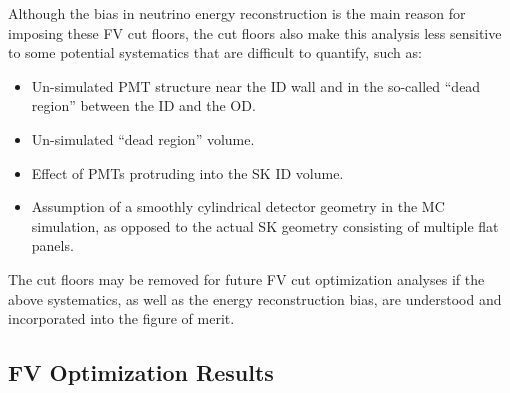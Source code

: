 Although the bias in neutrino energy reconstruction is the main reason for
imposing these FV cut floors, the cut floors also make this analysis less
sensitive to some potential systematics that are difficult to quantify, such
as:
%
\begin{itemize}
  \item Un-simulated PMT structure near the ID wall and in the so-called ``dead region'' between the ID and the OD.
  \item Un-simulated ``dead region'' volume.
  \item Effect of PMTs protruding into the SK ID volume.
  \item Assumption of a smoothly cylindrical detector geometry in the MC
    simulation, as opposed to the actual SK geometry consisting of multiple
    flat panels.
\end{itemize}
%
The cut floors may be removed for future FV cut optimization analyses if the
above systematics, as well as the energy reconstruction bias, are understood and
incorporated into the figure of merit. 



\subsection{FV Optimization Results}
\label{subsec:fvresults}


